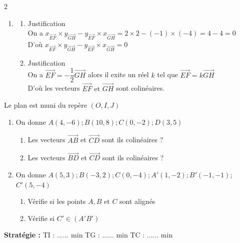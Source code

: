 \begin{multicols*}{2}
\begin{enumerate}
  		\[ xy' - yx' = kx'y' - kx'y' \]
  		\[ xy' - yx' = 0 \]
  		D'où   $xy' - yx' = 0$.
  		\item \begin{enumerate}
  			\item Justification\\
  			On a $ x_{\overrightarrow{EF}}\times y_{\overrightarrow{GH}}-y_{\overrightarrow{EF}}\times x_{\overrightarrow{GH}}=2\times 2-(-1)\times(-4)=4-4=0$
  			\\D'où $ x_{\overrightarrow{EF}}\times y_{\overrightarrow{GH}}-y_{\overrightarrow{EF}}\times x_{\overrightarrow{GH}}=0$
  			\item  Justification\\
  			On a $  \overrightarrow{EF} = -\dfrac{1}{2}\overrightarrow{GH} $ alors il exite un réel $ k $ tel que $  \overrightarrow{EF} = k\overrightarrow{GH} $\\
  			D'où les vecteurs $  \overrightarrow{EF}\mbox{ et }\overrightarrow{GH} $ sont colinéaires.
  		\end{enumerate}
  	\end{enumerate}
  	
  	 Le plan est muni du repère $(O, I, J)$
  	\begin{enumerate}
  		\item On donne $A(4, -6); B(10, 8); C(0, -2); D(3, 5)$
  		\begin{enumerate}
  			\item Les vecteurs $\overrightarrow{AB}$ et $\overrightarrow{CD}$ sont ils colinéaires ?
  			\item Les vecteurs $\overrightarrow{BD}$ et $\overrightarrow{CD}$ sont ils colinéaires ?
  		\end{enumerate}
  		\item On donne $A(5, 3); B(-3, 2); C(0, -4); A'(1, -2); B'(-1, -1)$;  $C'(5, -4)$
  		\begin{enumerate}
  			\item Vérifie si les points $A, B$ et $C$ sont alignés
  			\item Vérifie si $C' \in (A'B')$
  		\end{enumerate}
  	\end{enumerate}
  	\textbf{Stratégie :} TI : ...... min \quad TG : ...... min \quad TC : ...... min
  	

\end{multicols*}
